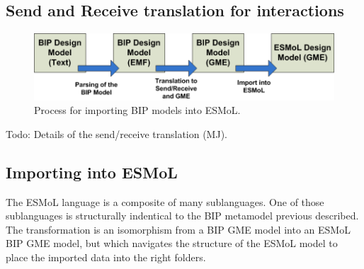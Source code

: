 \subsection{Send and Receive translation for interactions}

\begin{figure}[htb]
	\centering
		\includegraphics[width=1.00\columnwidth]{images/bip_import.png}
	\caption{Process for importing BIP models into ESMoL.}
	\label{fig:bip_import}
\end{figure}


Todo: Details of the send/receive translation (MJ).

\subsection{Importing into ESMoL}

The ESMoL language is a composite of many sublanguages.  One of those sublanguages is structurally indentical to the BIP metamodel previous described.  The transformation is an isomorphism from a BIP GME model into an ESMoL BIP GME model, but which navigates the structure of the ESMoL model to place the imported data into the right folders.

